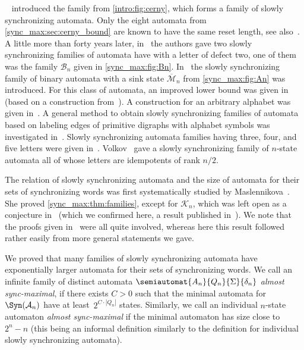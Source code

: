 \Cerny~\cite{Cer64} introduced the \Cerny family from \cref{intro:fig:cerny},
which forms a family of slowly synchronizing automata. Only the eight automata from \cref{sync_max:sec:cerny_bound} 
are known to have the same reset length, see also~\cite{DBLP:conf/lata/Volkov08}.
A little more than forty years later, in~\cite{AnanichevVZ07} the authors gave two slowly synchronizing families
of automata have with a letter of defect two, one of them was the family $\mathcal B_n$ given in \cref{sync_max:fig:Bn}.
In~\cite{Martugin08} the slowly synchronizing family of binary automata with a sink state
$\overline{\mathcal M}_n$ from \cref{sync_max:fig:An} was introduced. 
For this class of automata, an improved lower bound was given in~\cite{DBLP:journals/jalc/AnanichevV19} (based on a construction
from~\cite{Vorel2015_SynchronizationRoadColoringJumps}).
A construction for an arbitrary alphabet was given in~\cite{Pribavkina2011_SlowlySynchronizingZeroNoncomplete}.
A general method to obtain slowly synchronizing families of automata
based on labeling edges of primitive digraphs with alphabet symbols was investigated 
in~\cite{DBLP:conf/mfcs/AnanichevGV10,AnaVolGus2013}.
Slowly synchronizing automata families having three, four, and five letters
were given in~\cite{DonZB21}.
Volkov~\cite{DBLP:journals/jalc/Volkov19a} gave a slowly synchronizing family of $n$-state automata
all of whose letters are idempotents of rank $n / 2$.

The relation of slowly synchronizing automata and the size of automata for their sets
of synchronizing words was first systematically studied by Maslennikova~\cite{DBLP:journals/corr/Maslennikova14,DBLP:journals/ijfcs/Maslennikova19}.
She proved \cref{sync_max:thm:families}, except for $\mathcal K_n$, which was left
open as a conjecture in~\cite{DBLP:journals/ijfcs/Maslennikova19} (which we confirmed here,
a result published in~\cite{HoffmannCircularExtended}).
We note that the proofs given in~\cite{DBLP:journals/corr/Maslennikova14,DBLP:journals/ijfcs/Maslennikova19}
were all quite involved, whereas here this result followed rather easily
from more general statements we gave.

We proved that many families of slowly synchronizing automata
have exponentially larger automata for their sets of synchronizing words.
We call an infinite family of distinct automata $\semiautomat{A_n}{Q_n}{\Sigma}{\delta_n}$
\emph{almost sync-maximal}, if there exists $C > 0$
such that the minimal automata for $\Syn(\mathcal A_n)$
have at least~$2^{C \cdot |Q_n|}$ states. %
Similarly, we call an individual $n$-state automaton \emph{almost sync-maximal} if the minimal automaton
has size close to $2^n - n$ (this being an informal definition similarly to the definition for individual
slowly synchronizing automata).

